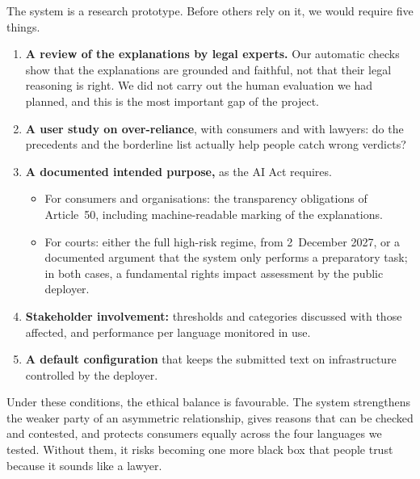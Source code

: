 The system is a research prototype. Before others rely on it, we would require five things.
\begin{enumerate}
  \item \textbf{A review of the explanations by legal experts.} Our automatic checks show that the explanations are grounded and faithful, not that their legal reasoning is right. We did not carry out the human evaluation we had planned, and this is the most important gap of the project.
  \item \textbf{A user study on over-reliance}, with consumers and with lawyers: do the precedents and the borderline list actually help people catch wrong verdicts?
  \item \textbf{A documented intended purpose,} as the AI Act requires.
    \begin{itemize}
      \item For consumers and organisations: the transparency obligations of Article~50, including machine-readable marking of the explanations.
      \item For courts: either the full high-risk regime, from 2~December 2027, or a documented argument that the system only performs a preparatory task; in both cases, a fundamental rights impact assessment by the public deployer.
    \end{itemize}
  \item \textbf{Stakeholder involvement:} thresholds and categories discussed with those affected, and performance per language monitored in use.
  \item \textbf{A default configuration} that keeps the submitted text on infrastructure controlled by the deployer.
\end{enumerate}

Under these conditions, the ethical balance is favourable. The system strengthens the weaker party of an asymmetric relationship, gives reasons that can be checked and contested, and protects consumers equally across the four languages we tested. Without them, it risks becoming one more black box that people trust because it sounds like a lawyer.
